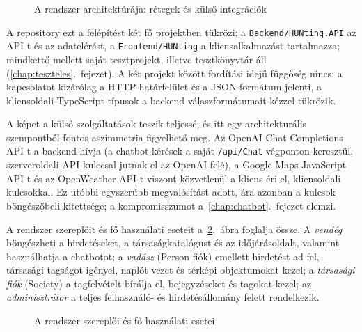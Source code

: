 \begin{figure}[htbp]
	\centering
	\caption{A rendszer architektúrája: rétegek és külső integrációk}
	\label{fig:architektura}
\end{figure}

A repository ezt a felépítést két fő projektben tükrözi: a \texttt{Backend/HUNting.API} az
API-t és az adatelérést, a \texttt{Frontend/HUNting} a kliensalkalmazást tartalmazza; mindkettő
mellett saját tesztprojekt, illetve tesztkönyvtár áll (\ref{chap:teszteles}.~fejezet). A két
projekt között fordítási idejű függőség nincs: a kapcsolatot kizárólag a HTTP-határfelület és
a JSON-formátum jelenti, a kliensoldali TypeScript-típusok a backend válaszformátumait kézzel
tükrözik.

A képet a külső szolgáltatások teszik teljessé, és itt egy architekturális szempontból fontos
aszimmetria figyelhető meg. Az OpenAI Chat Completions API-t a backend hívja (a chatbot-kérések
a saját \texttt{/api/Chat} végponton keresztül, szerveroldali API-kulccsal jutnak el az OpenAI
felé), a Google Maps JavaScript API-t és az OpenWeather API-t viszont közvetlenül a kliens éri
el, kliensoldali kulcsokkal. Ez utóbbi egyszerűbb megvalósítást adott, ára azonban a kulcsok
böngészőbeli kitettsége; a kompromisszumot a~\ref{chap:chatbot}.~fejezet elemzi.

A rendszer szereplőit és fő használati eseteit a~\ref{fig:usecase}.~ábra foglalja össze. A
\emph{vendég} böngészheti a hirdetéseket, a társaságkatalógust és az időjárásoldalt, valamint
használhatja a chatbotot; a \emph{vadász} (Person fiók) emellett hirdetést ad fel, társasági
tagságot igényel, naplót vezet és térképi objektumokat kezel; a \emph{társasági fiók} (Society)
a tagfelvételt bírálja el, bejegyzéseket és tagokat kezel; az \emph{adminisztrátor} a teljes
felhasználó- és hirdetésállomány felett rendelkezik.

\begin{figure}[htbp]
	\centering
	\caption{A rendszer szereplői és fő használati esetei}
	\label{fig:usecase}
\end{figure}

